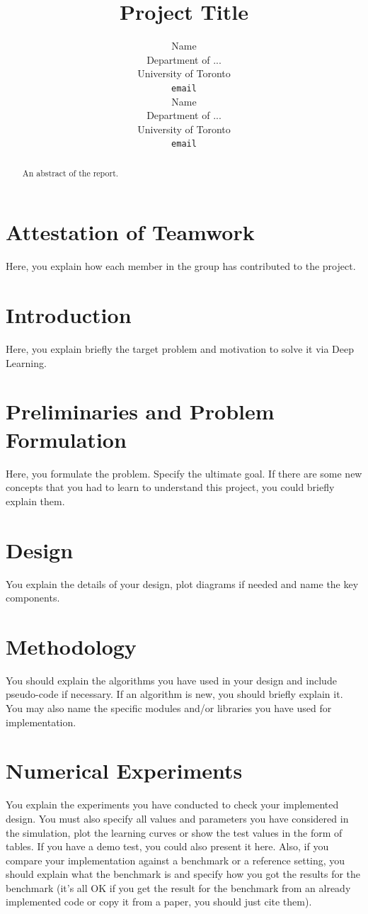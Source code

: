\documentclass{article}
\title{Project Title}
\author{%
  Name\\
  Department of ...\\
  University of Toronto\\
  \texttt{email} \\
  \And
  Name\\
  Department of ...\\
  University of Toronto\\
  \texttt{email} \\
}
\begin{document}
\maketitle


\begin{abstract}
An abstract of the report.
\end{abstract}

\section*{Attestation of Teamwork}
Here, you explain how each member in the group has contributed to the project. 



\section{Introduction}
Here, you explain briefly the target problem and motivation to solve it via Deep Learning.

\section{Preliminaries and Problem Formulation}
Here, you formulate the problem. Specify the ultimate goal. If there are some new concepts that you had to learn to understand this project, you could briefly explain them. 
	
\section{Design}
You explain the details of your design, plot diagrams if needed and name the key components. 




\section{Methodology}
You should explain the algorithms you have used in your design and include pseudo-code if necessary. If an algorithm is new, you should briefly explain it. You may also name the specific modules and/or libraries you have used for implementation.


\section{Numerical Experiments}

You explain the experiments you have conducted to check your implemented design. You must also specify all values and parameters you have considered in the simulation, plot the learning curves or show the test values in the form of tables. If you have a demo test, you could also present it here. Also, if you compare your implementation against a benchmark or a reference setting, you should explain what the benchmark is and specify how you got the results for the benchmark (it's all OK if you get the result for the benchmark from an already implemented code or copy it from a paper, you should just cite them).
\end{document}
